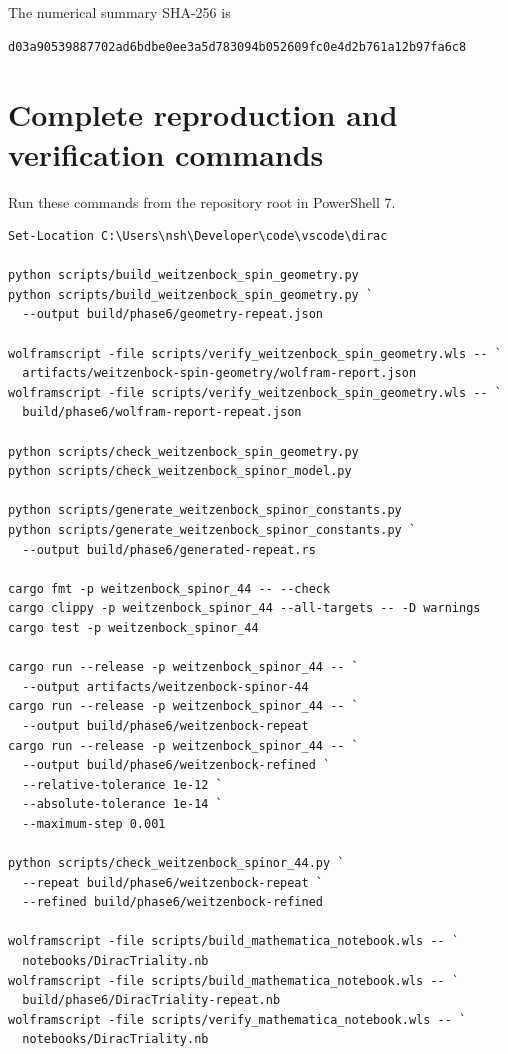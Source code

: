 \documentclass[11pt]{article}
\begin{document}
The numerical summary SHA-256 is

\begin{Verbatim}[fontsize=\small]
d03a90539887702ad6bdbe0ee3a5d783094b052609fc0e4d2b761a12b97fa6c8
\end{Verbatim}

\section{Complete reproduction and verification commands}

Run these commands from the repository root in PowerShell 7.

\begin{Verbatim}[fontsize=\small]
Set-Location C:\Users\nsh\Developer\code\vscode\dirac

python scripts/build_weitzenbock_spin_geometry.py
python scripts/build_weitzenbock_spin_geometry.py `
  --output build/phase6/geometry-repeat.json

wolframscript -file scripts/verify_weitzenbock_spin_geometry.wls -- `
  artifacts/weitzenbock-spin-geometry/wolfram-report.json
wolframscript -file scripts/verify_weitzenbock_spin_geometry.wls -- `
  build/phase6/wolfram-report-repeat.json

python scripts/check_weitzenbock_spin_geometry.py
python scripts/check_weitzenbock_spinor_model.py

python scripts/generate_weitzenbock_spinor_constants.py
python scripts/generate_weitzenbock_spinor_constants.py `
  --output build/phase6/generated-repeat.rs

cargo fmt -p weitzenbock_spinor_44 -- --check
cargo clippy -p weitzenbock_spinor_44 --all-targets -- -D warnings
cargo test -p weitzenbock_spinor_44

cargo run --release -p weitzenbock_spinor_44 -- `
  --output artifacts/weitzenbock-spinor-44
cargo run --release -p weitzenbock_spinor_44 -- `
  --output build/phase6/weitzenbock-repeat
cargo run --release -p weitzenbock_spinor_44 -- `
  --output build/phase6/weitzenbock-refined `
  --relative-tolerance 1e-12 `
  --absolute-tolerance 1e-14 `
  --maximum-step 0.001

python scripts/check_weitzenbock_spinor_44.py `
  --repeat build/phase6/weitzenbock-repeat `
  --refined build/phase6/weitzenbock-refined

wolframscript -file scripts/build_mathematica_notebook.wls -- `
  notebooks/DiracTriality.nb
wolframscript -file scripts/build_mathematica_notebook.wls -- `
  build/phase6/DiracTriality-repeat.nb
wolframscript -file scripts/verify_mathematica_notebook.wls -- `
  notebooks/DiracTriality.nb


\end{Verbatim}
\end{document}
